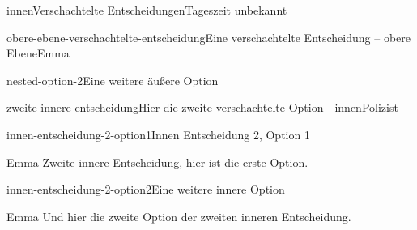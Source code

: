 \documentclass[12pt]{article}
\begin{document}
\begin{scene}{innen}{Verschachtelte Entscheidungen}{Tageszeit unbekannt}
\begin{decision}{obere-ebene-verschachtelte-entscheidung}{Eine verschachtelte Entscheidung -- obere Ebene}{Emma}
\begin{option}{nested-option-2}{Eine weitere äußere Option}
\begin{decision}{zweite-innere-entscheidung}{Hier die zweite verschachtelte Option - innen}{Polizist}
                    \begin{option}{innen-entscheidung-2-option1}{Innen Entscheidung 2, Option 1}
                        \begin{dialog}{Emma}
                            Zweite innere Entscheidung, hier ist die erste Option.
                        \end{dialog}
                    \end{option}
                    \begin{option}{innen-entscheidung-2-option2}{Eine weitere innere Option}
                        \begin{dialog}{Emma}
                            Und hier die zweite Option der zweiten inneren Entscheidung.
                        \end{dialog}
                    \end{option}
                \end{decision}
            \end{option}
        \end{decision}
    \end{scene}
\end{document}
